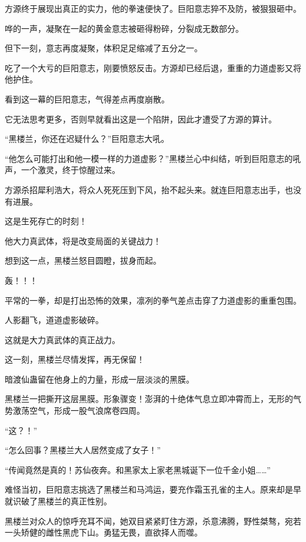 
\begin{this_body}

方源终于展现出真正的实力，他的拳速便快了。巨阳意志猝不及防，被狠狠砸中。

哗的一声，凝聚在一起的黄金意志被砸得粉碎，分裂成无数部分。

但下一刻，意志再度凝聚，体积足足缩减了五分之一。

吃了一个大亏的巨阳意志，刚要愤怒反击。方源却已经后退，重重的力道虚影又将他护住。

看到这一幕的巨阳意志，气得差点再度崩散。

它无法思考更多，否则早就看出这是一个陷阱，因此才遭受了方源的算计。

“黑楼兰，你还在迟疑什么？”巨阳意志大吼。

“他怎么可能打出和他一模一样的力道虚影？”黑楼兰心中纠结，听到巨阳意志的吼声，一个激灵，终于惊醒过来。

方源杀招犀利浩大，将众人死死压到下风，抬不起头来。就连巨阳意志出手，也没有进展。

这是生死存亡的时刻！

他大力真武体，将是改变局面的关键战力！

想到这一点，黑楼兰怒目圆瞪，拔身而起。

轰！！！

平常的一拳，却是打出恐怖的效果，凛冽的拳气差点击穿了力道虚影的重重包围。

人影翻飞，道道虚影破碎。

这就是大力真武体的真正战力。

这一刻，黑楼兰尽情发挥，再无保留！

暗渡仙蛊留在他身上的力量，形成一层淡淡的黑膜。

黑楼兰一把撕开这层黑膜。形象骤变！澎湃的十绝体气息立即冲霄而上，无形的气势激荡空气，形成一股气浪席卷四周。

“这？！”

“怎么回事？黑楼兰大人居然变成了女子！”

“传闻竟然是真的！苏仙夜奔。和黑家太上家老黑城诞下一位千金小姐……”

难怪当初，巨阳意志挑选了黑楼兰和马鸿运，要充作霜玉孔雀的主人。原来却是早就识破了黑楼兰的真正性别。

黑楼兰对众人的惊呼充耳不闻，她双目紧紧盯住方源，杀意沸腾，野性桀骜，宛若一头矫健的雌性黑虎下山。勇猛无畏，直欲择人而噬。


\end{this_body}
